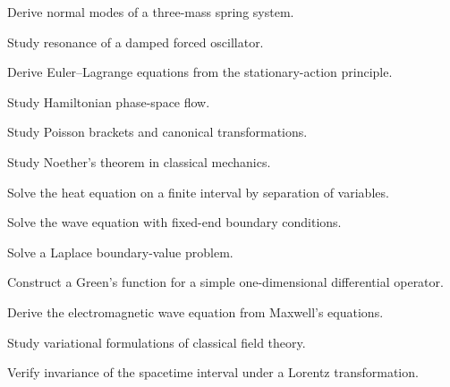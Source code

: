 \begin{exercise}[4]
Derive normal modes of a three-mass spring system.
\end{exercise}

\begin{exercise}[4]
Study resonance of a damped forced oscillator.
\end{exercise}

\begin{exercise}[4]
Derive Euler--Lagrange equations from the stationary-action principle.
\end{exercise}

\begin{exercise}[4]
Study Hamiltonian phase-space flow.
\end{exercise}

\begin{exercise}[4]
Study Poisson brackets and canonical transformations.
\end{exercise}

\begin{exercise}[4]
Study Noether's theorem in classical mechanics.
\end{exercise}

\begin{exercise}[4]
Solve the heat equation on a finite interval by separation of variables.
\end{exercise}

\begin{exercise}[4]
Solve the wave equation with fixed-end boundary conditions.
\end{exercise}

\begin{exercise}[4]
Solve a Laplace boundary-value problem.
\end{exercise}

\begin{exercise}[4]
Construct a Green's function for a simple one-dimensional differential
operator.
\end{exercise}

\begin{exercise}[4]
Derive the electromagnetic wave equation from Maxwell's equations.
\end{exercise}

\begin{exercise}[4]
Study variational formulations of classical field theory.
\end{exercise}

\begin{exercise}[4]
Verify invariance of the spacetime interval under a Lorentz transformation.
\end{exercise}

